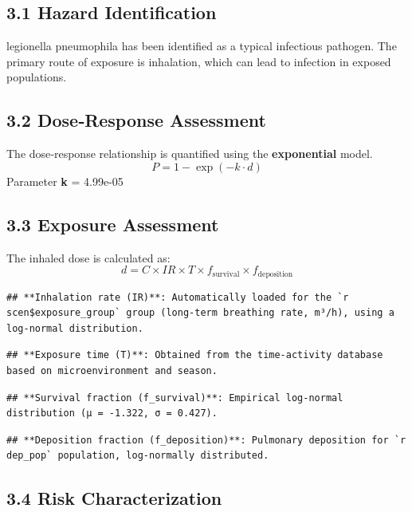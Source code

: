 \documentclass[
]{article}
\begin{document}
\subsection{3.1 Hazard Identification}\label{hazard-identification}

legionella pneumophila has been identified as a typical infectious
pathogen. The primary route of exposure is inhalation, which can lead to
infection in exposed populations.

\subsection{3.2 Dose‑Response Assessment}\label{doseresponse-assessment}

The dose‑response relationship is quantified using the
\textbf{exponential} model. \[P = 1 - \exp(-k \cdot d)\] Parameter
\textbf{k} = 4.99e-05

\subsection{3.3 Exposure Assessment}\label{exposure-assessment}

The inhaled dose is calculated as:
\[d = C \times IR \times T \times f_{\text{survival}} \times f_{\text{deposition}}\]

\begin{verbatim}
## **Inhalation rate (IR)**: Automatically loaded for the `r scen$exposure_group` group (long‑term breathing rate, m³/h), using a log‑normal distribution.
\end{verbatim}

\begin{verbatim}
## **Exposure time (T)**: Obtained from the time‑activity database based on microenvironment and season.
\end{verbatim}

\begin{verbatim}
## **Survival fraction (f_survival)**: Empirical log‑normal distribution (μ = -1.322, σ = 0.427).
\end{verbatim}

\begin{verbatim}
## **Deposition fraction (f_deposition)**: Pulmonary deposition for `r dep_pop` population, log‑normally distributed.
\end{verbatim}

\subsection{3.4 Risk Characterization}\label{risk-characterization}
\end{document}

